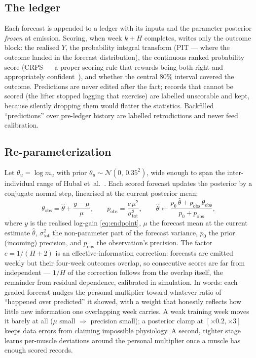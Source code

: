 \documentclass[11pt,a4paper]{article}
\begin{document}
\subsection{The ledger}
Each forecast is appended to a ledger with its inputs and the parameter posterior \emph{frozen} at emission. Scoring, when week $k{+}H$ completes, writes only the outcome block: the realised $Y$, the probability integral transform (PIT --- where the outcome landed in the forecast distribution), the continuous ranked probability score (CRPS --- a proper scoring rule that rewards being both right and appropriately confident~\cite{gneiting}), and whether the central 80\% interval covered the outcome. Predictions are never edited after the fact; records that cannot be scored (the lifter stopped logging that exercise) are labelled unscorable and kept, because silently dropping them would flatter the statistics. Backfilled ``predictions'' over pre-ledger history are labelled retrodictions and never feed calibration.

\subsection{Re-parameterization}
Let $\theta_u=\log m_u$ with prior $\theta_u\sim\mathcal{N}(0,\,0.35^2)$, wide enough to span the inter-individual range of Hubal et~al.~\cite{hubal}. Each scored forecast updates the posterior by a conjugate normal step, linearised at the current posterior mean:
\begin{equation}\label{eq:ledgerupdate}
\theta_{\text{obs}}=\hat\theta+\frac{y-\mu}{\mu},\qquad
p_{\text{obs}}=\frac{c\,\mu^{2}}{\sigma^{2}_{\text{tot}}},\qquad
\hat\theta \leftarrow \frac{p_0\,\hat\theta+p_{\text{obs}}\,\theta_{\text{obs}}}{p_0+p_{\text{obs}}},
\end{equation}
where $y$ is the realised log-gain \eqref{eq:endpoint}, $\mu$ the forecast mean at the current estimate $\hat\theta$, $\sigma^{2}_{\text{tot}}$ the non-parameter part of the forecast variance, $p_0$ the prior (incoming) precision, and $p_{\text{obs}}$ the observation's precision. The factor $c=1/(H{+}2)$ is an effective-information correction: forecasts are emitted weekly but their four-week outcomes overlap, so consecutive scores are far from independent --- $1/H$ of the correction follows from the overlap itself, the remainder from residual dependence, calibrated in simulation. In words: each graded forecast nudges the personal multiplier toward whatever ratio of ``happened over predicted'' it showed, with a weight that honestly reflects how little new information one overlapping week carries. A weak training week moves it barely at all ($\mu$ small $\Rightarrow$ precision small); a posterior clamp at $[\times0.2,\times3]$ keeps data errors from claiming impossible physiology. A second, tighter stage learns per-muscle deviations around the personal multiplier once a muscle has enough scored records.
\end{document}
